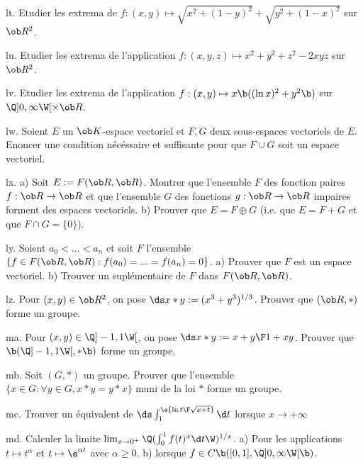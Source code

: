 \exo [Level=2,Fight=1,Learn=1,Type=\Exercices,Field=\Extrema,Origin=] lt. 
Etudier les extrema de $f:(x,y)\mapsto\sqrt{x^2+(1-y)^2}+\sqrt{y^2+(1-x)^2}$ sur $\ob R^2$. 

\exo [Level=2,Fight=1,Learn=1,Type=\Exercices,Field=\Extrema,Origin=] lu. 
Etudier les extrema de l'application $f:(x,y,z)\mapsto x^2+y^2+z^2-2xyz$ sur $\ob R^2$. 

\exo [Level=2,Fight=1,Learn=1,Type=\Exercices,Field=\Extrema,Origin=] lv. 
Etudier les extrema de l'application $f:(x,y)\mapsto x\b((\ln x)^2 +y^2\b)$ sur $\Q]0,\infty\W[\times\ob R$. 

\exo [Level=1,Fight=1,Learn=1,Type=\Exercices,Field=\EspacesVectoriels,Origin=] lw. 
Soient $E$ un $\ob K$-espace vectoriel et $F,G$ deux sous-espaces vectoriels de $E$. Enoncer une condition nécéssaire et suffisante pour que $F\cup G$ 
soit un espace vectoriel. 

\exo [Level=1,Fight=1,Learn=1,Type=\Exercices,Field=\EspacesVectoriels,Origin=] lx. 
a) Soit $E:=\sc F(\ob R,\ob R)$. Montrer que l'ensemble $F$ des fonction paires $f:\ob R\to\ob R$ 
et que l'ensemble $G$ des fonctions $g:\ob R\to\ob R$ impaires
forment des espaces vectoriels. \pn 
b) Prouver que $E=F\oplus G$ (i.e. que $E=F+G$ et que $F\cap G=\{0\}$). 

\exo [Origin=,Level=1,Fight=1,Learn=2,Type=\Colles,Field=\EspacesVectoriels] ly. 
Soient $a_0<...<a_n$ et soit $F$ l'ensemble $\{f\in\sc F(\ob R,\ob R):f(a_0)=...=f(a_n)=0\}$. \pn
a) Prouver que $F$ est un espace vectoriel. \pn
b) Trouver un suplémentaire de $F$ dans $\sc F(\ob R,\ob R)$. 


\exo [Level=1,Fight=1,Learn=1,Type=\Exercices,Field=\Groupes,Origin=] lz. 
Pour $(x,y)\in\ob R^2$, on pose $\ds x*y:=(x^3+y^3)^{1/3}$. 
Prouver que $(\ob R,*)$ forme un groupe. 

\exo [Level=1,Fight=1,Learn=1,Type=\Exercices,Field=\Groupes,Origin=] ma. 
Pour $(x,y)\in\Q]-1,1\W[$, on pose $\ds x*y:={x+y\F1+xy}$. Prouver que $\b(\Q]-1,1\W[,*\b)$ forme un groupe. 

\exo [Level=1,Fight=1,Learn=1,Type=\Exercices,Field=\Groupes,Origin=] mb. 
Soit $(G,*)$ un groupe. Prouver que l'ensemble $\{x\in G:\forall y\in G, x*y=y*x\}$ muni de la loi $*$ 
forme un groupe. 

\exo [Level=2,Fight=1,Learn=1,Type=\Exercices,Field=\FonctionsDéfiniesParUneIntégrale,Origin=] mc. 
Trouver un équivalent de $\ds \int_1^\e{\ln t\F\sqrt{x+t}}\d t$ lorsque $x\to+\infty$

\exo [Level=1,Fight=3,Learn=1,Type=\Exercices,Field=\Intégration,Origin=] md. 
Calculer la limite $\lim_{x\to 0^+}\Q(\int_0^1f(t)^x\d t\W)^{1/x}$. \pn
a) Pour les applications $t\mapsto t^\alpha$ et $t\mapsto \e^{\alpha t}$ avec $\alpha\ge0$. \pn
b) lorsque $f\in\sc C\b([0,1],\Q]0,\infty\W[\b)$. 

